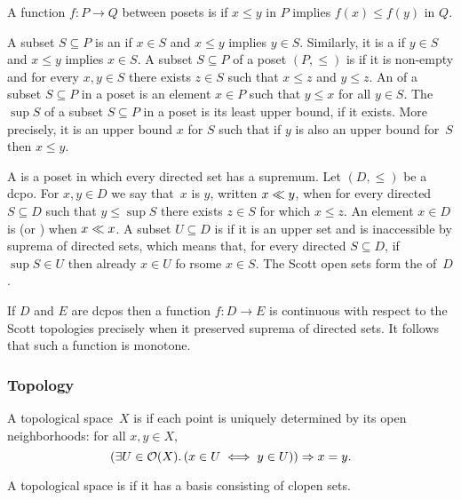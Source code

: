 A function $f : P \to Q$ between posets is  if $x \leq
y$ in $P$ implies $f(x) \leq f(y)$ in $Q$.

A subset $S \subseteq P$ is an  if $x \in S$ and $x
\leq y$ implies $y \in S$. Similarly, it is a  if $y
\in S$ and $x \leq y$ implies $x \in S$.
%
A subset $S \subseteq P$ of a poset $(P, {\leq})$ is 
if it is non-empty and for every $x, y \in S$ there exists $z \in S$
such that $x \leq z$ and $y \leq z$.
%
An  of a subset $S \subseteq P$ in a poset is an
element $x \in P$ such that $y \leq x$ for all $y \in S$.
%
The  $\sup S$ of a subset $S \subseteq P$ in a poset is
its least upper bound, if it exists. More precisely, it is an upper
bound $x$ for $S$ such that if $y$ is also an upper bound for~$S$ then
$x \leq y$.

A  is a poset in which
every directed set has a supremum. Let $(D, {\leq})$ be a dcpo. For
$x, y \in D$ we say that~$x$ is  $y$, written $x \ll
y$, when for every directed $S \subseteq D$ such that $y \leq \sup S$
there exists $z \in S$ for which $x \leq z$. An element $x \in D$ is
 (or ) when $x \ll x$. A subset $U
\subseteq D$ is  if it is an upper set and is
inaccessible by suprema of directed sets, which means that, for every
directed $S \subseteq D$, if $\sup S \in U$ then already $x \in U$ fo
rsome $x \in S$. The Scott open sets form the 
of~$D$.

If $D$ and $E$ are dcpos then a function $f : D \to E$ is continuous
with respect to the Scott topologies precisely when it preserved
suprema of directed sets. It follows that such a function is monotone.


\subsubsection*{Topology}

A topological space~$X$ is  if each point is
uniquely determined by its open neighborhoods: for all $x, y \in
X$,
%
\begin{equation*}
  (\exists U \in \mathcal{O}(X) .\, (x \in U \iff y \in U)) \Rightarrow x = y.
\end{equation*}

A topological space is  if it has a basis
consisting of clopen sets.






